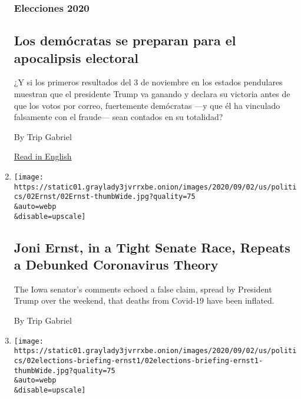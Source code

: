 \begin{enumerate}
  \hypertarget{elecciones-2020}{%
  \subsubsection{Elecciones 2020}\label{elecciones-2020}}

  \hypertarget{los-demuxf3cratas-se-preparan-para-el-apocalipsis-electoral}{%
  \subsection{Los demócratas se preparan para el apocalipsis
  electoral}\label{los-demuxf3cratas-se-preparan-para-el-apocalipsis-electoral}}

  ¿Y si los primeros resultados del 3 de noviembre en los estados
  pendulares muestran que el presidente Trump va ganando y declara su
  victoria antes de que los votos por correo, fuertemente demócratas
  ---y que él ha vinculado falsamente con el fraude--- sean contados en
  su totalidad?

  By Trip Gabriel

  \href{https://www.nytimes3xbfgragh.onion/2020/09/02/us/politics/voting-election-day.html}{Read
  in English}
\item
  \href{/2020/09/02/us/politics/joni-ernst-coronavirus.html}{}

  \texttt{[image: https://static01.graylady3jvrrxbe.onion/images/2020/09/02/us/politics/02Ernst/02Ernst-thumbWide.jpg?quality=75\\\&auto=webp\\\&disable=upscale]}

  \hypertarget{joni-ernst-in-a-tight-senate-race-repeats-a-debunked-coronavirus-theory}{%
  \subsection{Joni Ernst, in a Tight Senate Race, Repeats a Debunked
  Coronavirus
  Theory}\label{joni-ernst-in-a-tight-senate-race-repeats-a-debunked-coronavirus-theory}}

  The Iowa senator's comments echoed a false claim, spread by President
  Trump over the weekend, that deaths from Covid-19 have been inflated.

  By Trip Gabriel
\item
  \href{/2020/09/02/us/elections/as-virus-cases-spike-in-iowa-joni-ernst-spreads-a-debunked-theory-of-inflated-death-figures.html}{}

  \texttt{[image: https://static01.graylady3jvrrxbe.onion/images/2020/09/02/us/politics/02elections-briefing-ernst1/02elections-briefing-ernst1-thumbWide.jpg?quality=75\\\&auto=webp\\\&disable=upscale]}


\end{enumerate}
